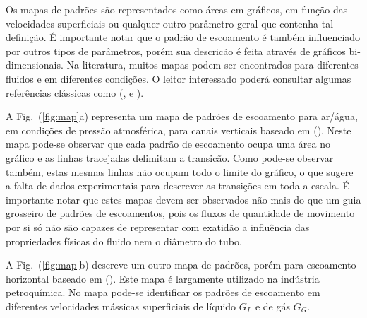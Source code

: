 Os mapas de padrões são representados como áreas em gráficos, em função
das velocidades superficiais ou qualquer outro parâmetro geral que
contenha tal definição. É importante notar que o padrão de escoamento é
também influenciado por outros tipos de parâmetros, porém sua descricão
é feita através de gráficos bi-dimensionais. Na literatura, muitos mapas
podem ser encontrados para diferentes fluidos e em diferentes condições.
O leitor interessado poderá consultar algumas referências clássicas como
(\cite{collier1996}, \cite{whalley1987} e \cite{thome2008}).

A Fig.~(\ref{fig:map}a) representa um mapa de padrões de escoamento para
ar/água, em condições de pressão atmosférica, para canais verticais
baseado em (\cite{hewitt1969}). Neste mapa pode-se observar que cada
padrão de escoamento ocupa uma área no gráfico e as linhas tracejadas
delimitam a transicão. Como pode-se observar também, estas mesmas linhas
não ocupam todo o limite do gráfico, o que sugere a falta de dados
experimentais para descrever as transições em toda a escala. É
importante notar que estes mapas devem ser observados não mais do que um
guia grosseiro de padrões de escoamentos, pois os fluxos de quantidade
de movimento por si só não são capazes de representar com exatidão a
influência das propriedades físicas do fluido nem o diâmetro do tubo.

A Fig.~(\ref{fig:map}b) descreve um outro mapa de padrões, porém para
escoamento horizontal baseado em (\cite{baker1954}). Este mapa é
largamente utilizado na indústria petroquímica. No mapa pode-se
identificar os padrões de escoamento em diferentes velocidades mássicas
superficiais de líquido $G_L$ e de gás $G_G$. 

